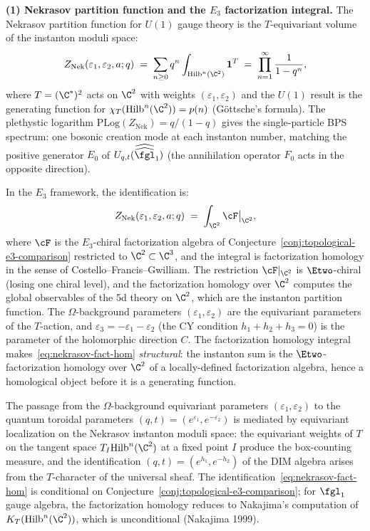 \medskip
\noindent\textbf{(1) Nekrasov partition function and the $E_3$ factorization integral.}
The Nekrasov partition function for $U(1)$ gauge theory is the $T$-equivariant volume of the instanton moduli space:
\begin{equation}
 Z_{\mathrm{Nek}}(\varepsilon_1, \varepsilon_2, a; q) \;=\; \sum_{n \geq 0} q^n \int_{\mathrm{Hilb}^n(\C^2)} \mathbf{1}^{T}
 \;=\; \prod_{n=1}^{\infty} \frac{1}{1 - q^n},
 \label{eq:nekrasov-u1}
\end{equation}
where $T = (\C^*)^2$ acts on $\C^2$ with weights $(\varepsilon_1, \varepsilon_2)$ and the $U(1)$ result is the generating function for $\chi_T(\mathrm{Hilb}^n(\C^2)) = p(n)$ (G\"ottsche's formula). The plethystic logarithm $\mathrm{PLog}(Z_{\mathrm{Nek}}) = q/(1-q)$ gives the single-particle BPS spectrum: one bosonic creation mode at each instanton number, matching the positive generator $E_0$ of $U_{q,t}(\widehat{\widehat{\fgl}}_1)$ (the annihilation operator $F_0$ acts in the opposite direction).

In the $E_3$ framework, the identification is:
\begin{equation}
 Z_{\mathrm{Nek}}(\varepsilon_1, \varepsilon_2, a; q) \;=\; \int_{\C^2} \cF\big|_{\C^2},
 \label{eq:nekrasov-fact-hom}
\end{equation}
where $\cF$ is the $E_3$-chiral factorization algebra of Conjecture~\ref{conj:topological-e3-comparison} restricted to $\C^2 \subset \C^3$, and the integral is factorization homology in the sense of Costello--Francis--Gwilliam. The restriction $\cF|_{\C^2}$ is $\Etwo$-chiral (losing one chiral level), and the factorization homology over $\C^2$ computes the global observables of the 5d theory on $\C^2$, which are the instanton partition function. The $\Omega$-background parameters $(\varepsilon_1, \varepsilon_2)$ are the equivariant parameters of the $T$-action, and $\varepsilon_3 = -\varepsilon_1 - \varepsilon_2$ (the CY condition $h_1 + h_2 + h_3 = 0$) is the parameter of the holomorphic direction $C$. The factorization homology integral makes~\eqref{eq:nekrasov-fact-hom} \emph{structural}: the instanton sum is the $\Etwo$-factorization homology over $\C^2$ of a locally-defined factorization algebra, hence a homological object before it is a generating function.

\begin{remark}
\label{rem:nekrasov-scope}
The passage from the $\Omega$-background equivariant parameters $(\varepsilon_1, \varepsilon_2)$ to the quantum toroidal parameters $(q, t) = (e^{\varepsilon_1}, e^{-\varepsilon_2})$ is mediated by equivariant localization on the Nekrasov instanton moduli space: the equivariant weights of $T$ on the tangent space $T_I \mathrm{Hilb}^n(\C^2)$ at a fixed point $I$ produce the box-counting measure, and the identification $(q, t) = (e^{h_1}, e^{-h_2})$ of the DIM algebra arises from the $T$-character of the universal sheaf. The identification~\eqref{eq:nekrasov-fact-hom} is conditional on Conjecture~\ref{conj:topological-e3-comparison}; for $\fgl_1$ gauge algebra, the factorization homology reduces to Nakajima's computation of $K_T(\mathrm{Hilb}^n(\C^2))$, which is unconditional (Nakajima 1999).
\end{remark}

